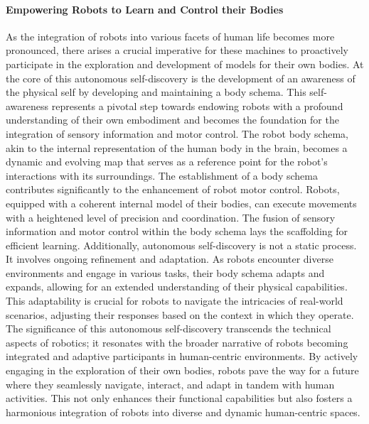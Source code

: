 \paragraph*{Empowering Robots to Learn and Control their Bodies} As the integration of robots into various facets of human life becomes more pronounced, there arises a crucial imperative for these machines to proactively participate in the exploration and development of models for their own bodies. At the core of this autonomous self-discovery is the development of an awareness of the physical self by developing and maintaining a body schema. This self-awareness represents a pivotal step towards endowing robots with a profound understanding of their own embodiment and becomes the foundation for the integration of sensory information and motor control. The robot body schema, akin to the internal representation of the human body in the brain, becomes a dynamic and evolving map that serves as a reference point for the robot's interactions with its surroundings. The establishment of a body schema contributes significantly to the enhancement of robot motor control. Robots, equipped with a coherent internal model of their bodies, can execute movements with a heightened level of precision and coordination. The fusion of sensory information and motor control within the body schema lays the scaffolding for efficient learning. Additionally, autonomous self-discovery is not a static process. It involves ongoing refinement and adaptation. As robots encounter diverse environments and engage in various tasks, their body schema adapts and expands, allowing for an extended understanding of their physical capabilities. This adaptability is crucial for robots to navigate the intricacies of real-world scenarios, adjusting their responses based on the context in which they operate. The significance of this autonomous self-discovery transcends the technical aspects of robotics; it resonates with the broader narrative of robots becoming integrated and adaptive participants in human-centric environments. By actively engaging in the exploration of their own bodies, robots pave the way for a future where they seamlessly navigate, interact, and adapt in tandem with human activities. This not only enhances their functional capabilities but also fosters a harmonious integration of robots into diverse and dynamic human-centric spaces.

